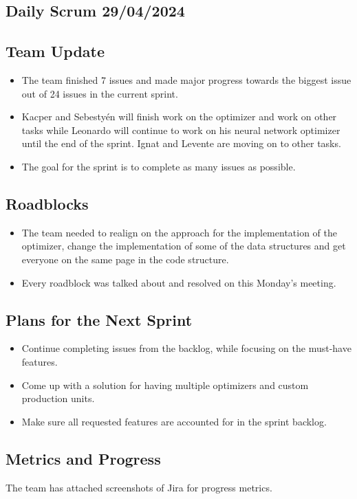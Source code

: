 \documentclass[12pt]{report}
\begin{document}

\subsection*{Daily Scrum 29/04/2024}
\subsection*{Team Update}
\begin{itemize}
    \item The team finished 7 issues and made major progress towards the biggest issue out of 24 issues in the current sprint.
    \item Kacper and Sebestyén will finish work on the optimizer and work on other tasks while Leonardo will continue to work on his neural network optimizer until the end of the sprint. Ignat and Levente are moving on to other tasks.
    \item The goal for the sprint is to complete as many issues as possible.
\end{itemize}

\subsection*{Roadblocks}
\begin{itemize}
    \item The team needed to realign on the approach for the implementation of the optimizer, change the implementation of some of the data structures and get everyone on the same page in the code structure.
    \item Every roadblock was talked about and resolved on this Monday’s meeting.
\end{itemize}

\subsection*{Plans for the Next Sprint}
\begin{itemize}
    \item Continue completing issues from the backlog, while focusing on the must-have features.
    \item Come up with a solution for having multiple optimizers and custom production units.
    \item Make sure all requested features are accounted for in the sprint backlog.
\end{itemize}

\subsection*{Metrics and Progress}
The team has attached screenshots of Jira for progress metrics.
\end{document}
